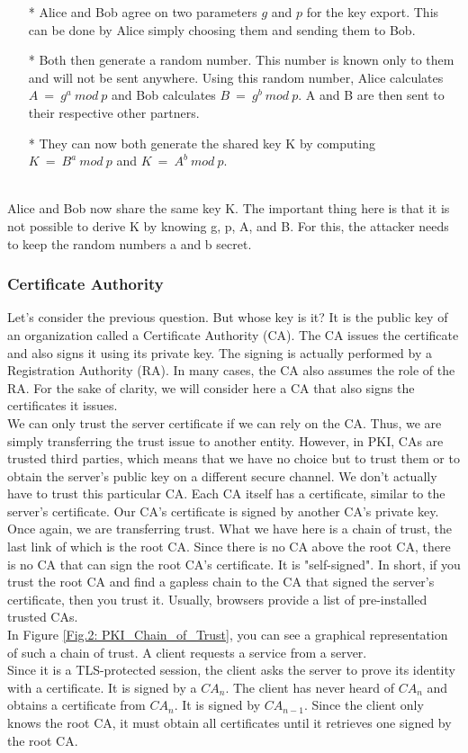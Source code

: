 \begin{enumerate}[]
    \item[*] Alice and Bob agree on two parameters $g$ and $p$ for the key export. This can be done by Alice simply choosing them and sending them to Bob.
    \item[*] Both then generate a random number. This number is known only to them and will not be sent anywhere. Using this random number, Alice calculates $A \ = \ g^a \ mod \ p$ and Bob calculates $B \ = \ g^b \ mod \ p$. A and B are then sent to their respective other partners.
    \item[*] They can now both generate the shared key K by computing $K \ = \ B^a \ mod \ p$ and $K \ = \ A^b \ mod \ p$.
\end{enumerate}
\\
Alice and Bob now share the same key K. The important thing here is that it is not possible 
to derive K by knowing g, p, A, and B. For this, the attacker needs to keep the random numbers 
a and b secret.

\subsubsection{Certiﬁcate Authority}\cite{b38}
Let's consider the previous question. But whose key is it? It is the public key of an 
organization called a Certificate Authority (CA). The CA issues the certificate and 
also signs it using its private key. The signing is actually performed by a 
Registration Authority (RA). In many cases, the CA also assumes the role of the RA. 
For the sake of clarity, we will consider here a CA that also signs the certificates 
it issues.
\\
We can only trust the server certificate if we can rely on the CA. Thus, we are 
simply transferring the trust issue to another entity. However, in PKI, CAs are 
trusted third parties, which means that we have no choice but to trust them or to 
obtain the server's public key on a different secure channel. We don't actually have 
to trust this particular CA. Each CA itself has a certificate, similar to the server's 
certificate. Our CA's certificate is signed by another CA's private key. Once again, 
we are transferring trust. What we have here is a chain of trust, the last link of which 
is the root CA. Since there is no CA above the root CA, there is no CA that can sign 
the root CA's certificate. It is "self-signed". In short, if you trust the root CA and 
find a gapless chain to the CA that signed the server's certificate, then you trust it. 
Usually, browsers provide a list of pre-installed trusted CAs.
\\
In Figure \ref{Fig.2: PKI_Chain_of_Trust}, you can see a graphical representation of 
such a chain of trust. A client requests a service from a server.
\\
Since it is a TLS-protected session, the client asks the server to prove its identity 
with a certificate. It is signed by a $CA_n$. The client has never heard of $CA_n$ and obtains 
a certificate from $CA_n$. It is signed by $CA_{n-1}$. Since the client only knows the root CA, 
it must obtain all certificates until it retrieves one signed by the root CA.

